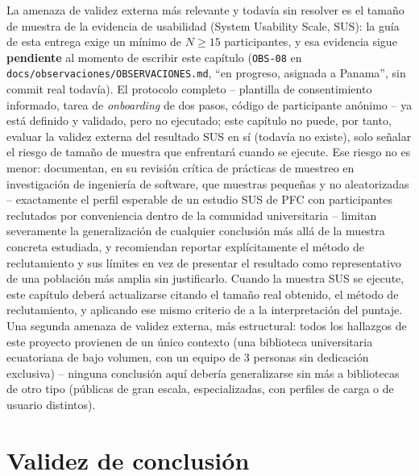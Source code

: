 La amenaza de validez externa más relevante y todavía sin resolver es el
tamaño de muestra de la evidencia de usabilidad (System Usability Scale,
SUS): la guía de esta entrega exige un mínimo de $N\geq15$ participantes,
y esa evidencia sigue \textbf{pendiente} al momento de escribir este
capítulo (\texttt{OBS-08} en
\texttt{docs/observaciones/OBSERVACIONES.md}, ``en progreso, asignada a
Panama'', sin commit real todavía). El protocolo completo -- plantilla de
consentimiento informado, tarea de \emph{onboarding} de dos pasos,
código de participante anónimo -- ya está definido y validado, pero no
ejecutado; este capítulo no puede, por tanto, evaluar la validez externa
del resultado SUS en sí (todavía no existe), solo señalar el riesgo de
tamaño de muestra que enfrentará cuando se ejecute. Ese riesgo no es
menor: \citet{baltes2022sampling} documentan, en su revisión crítica de
prácticas de muestreo en investigación de ingeniería de software, que
muestras pequeñas y no aleatorizadas -- exactamente el perfil esperable
de un estudio SUS de PFC con participantes reclutados por conveniencia
dentro de la comunidad universitaria -- limitan severamente la
generalización de cualquier conclusión más allá de la muestra concreta
estudiada, y recomiendan reportar explícitamente el método de
reclutamiento y sus límites en vez de presentar el resultado como
representativo de una población más amplia sin justificarlo. Cuando la
muestra SUS se ejecute, este capítulo deberá actualizarse citando el
tamaño real obtenido, el método de reclutamiento, y aplicando ese mismo
criterio de \citet{baltes2022sampling} a la interpretación del puntaje.
Una segunda amenaza de validez externa, más estructural: todos los
hallazgos de este proyecto provienen de un único contexto (una biblioteca
universitaria ecuatoriana de bajo volumen, con un equipo de 3 personas
sin dedicación exclusiva) -- ninguna conclusión aquí debería
generalizarse sin más a bibliotecas de otro tipo (públicas de gran
escala, especializadas, con perfiles de carga o de usuario distintos).

\section{Validez de conclusión}

